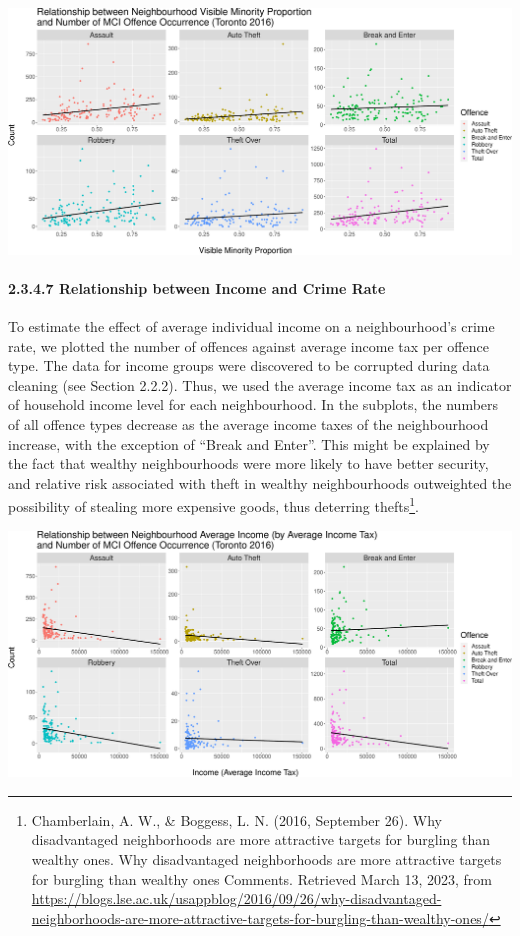 \documentclass[
]{article}
\begin{document}
\includegraphics{Final-Report_files/figure-latex/crime-vs-minority-plot-1.pdf}

\hypertarget{relationship-between-income-and-crime-rate}{%
\paragraph{2.3.4.7 Relationship between Income and Crime
Rate}\label{relationship-between-income-and-crime-rate}}

To estimate the effect of average individual income on a neighbourhood's
crime rate, we plotted the number of offences against average income tax
per offence type. The data for income groups were discovered to be
corrupted during data cleaning (see Section 2.2.2). Thus, we used the
average income tax as an indicator of household income level for each
neighbourhood. In the subplots, the numbers of all offence types
decrease as the average income taxes of the neighbourhood increase, with
the exception of ``Break and Enter''. This might be explained by the
fact that wealthy neighbourhoods were more likely to have better
security, and relative risk associated with theft in wealthy
neighbourhoods outweighted the possibility of stealing more expensive
goods, thus deterring thefts\footnote{Chamberlain, A. W., \& Boggess, L.
  N. (2016, September 26). Why disadvantaged neighborhoods are more
  attractive targets for burgling than wealthy ones. Why disadvantaged
  neighborhoods are more attractive targets for burgling than wealthy
  ones Comments. Retrieved March 13, 2023, from
  \url{https://blogs.lse.ac.uk/usappblog/2016/09/26/why-disadvantaged-neighborhoods-are-more-attractive-targets-for-burgling-than-wealthy-ones/}}.

\includegraphics{Final-Report_files/figure-latex/crime-vs-income-plot-1.pdf}
\end{document}
